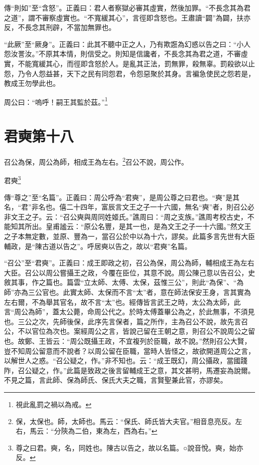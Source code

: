 {\noindent\zhuan{}\fzbyks 傳“則如”至“含怒”。正義曰：君人者察獄必審其虛實，然後加罪。“不長念其為君之道”，謂不審察虛實也。“不寬緩其心”，言徑即含怒也。王肅讀“闢”為闢，扶亦反，不長念其刑辟，不當加無罪也。 \par}

{\noindent\shu{}\fzkt “此厥”至“厥身”。正義曰：此其不聽中正之人，乃有欺誑為幻惑以告之曰：“小人怨汝詈汝。”不原其本情，則信受之。則知是信讒者，不長念其為君之道，不審虛實，不能寬緩其心，而徑即含怒於人。是亂其正法，罰無罪，殺無辜。罰殺欲以止怨，乃令人怨益甚，天下之民有同怨君，令怨惡聚於其身。言褊急使民之怨若是，教成王勿學此也。 \par}

周公曰：“嗚呼！嗣王其監於茲。”\footnote{視此亂罰之禍以為戒。}

\section{君奭第十八}


召公為保，周公為師，相成王為左右。\footnote{保，太保也。師，太師也。馬云：“保氏、師氏皆大夫官。”相音息亮反。左右，馬云：“分陝為二伯，東為左，西為右。”}召公不說，周公作。

君奭\footnote{尊之曰君。奭，名，同姓也。陳古以告之，故以名篇。○說音悅。奭，始亦反。}


{\noindent\zhuan{}\fzbyks 傳“尊之”至“名篇”。正義曰：周公呼為“君奭”，是周公尊之曰君也。“奭”是其名，“君”非名也。僖二十四年，富辰言文王之子一十六國，無名“奭”者，則召公必非文王之子。云：“召公奭與周同姓姬氏。”譙周曰：“周之支族。”譙周考校古史，不能知其所出。皇甫謐云：“原公名豐，是其一也，是為文王之子一十六國。”然文王之子本無定數，並原、豐為一，當召公於中以為十六，謬矣。此篇多言先世有大臣輔政，是“陳古道以告之”。呼居奭以告之，故以“君奭”名篇。 \par}

{\noindent\shu{}\fzkt “召公”至“君奭”。正義曰：成王即政之初，召公為保，周公為師，輔相成王為左右大臣。召公以周公嘗攝王之政，今覆在臣位，其意不說。周公陳己意以告召公，史敘其事，作之篇也。篇雲“立太師、太傅、太保，茲惟三公”，則此“為保”、“為師”亦為三公官也。此實太師、太保而不言“太”者，意在師法保安王身，言其實為左右爾，不為舉其官名，故不言“太”也。經傳皆言武王之時，太公為太師，此言“周公為師”，蓋太公薨，命周公代之。於時太傅蓋畢公為之，於此無事，不須見也。三公之次，先師後保，此序先言保者，篇之所作，主為召公不說，故先言召公，不以官位為次也。案經周公之言，皆說己留在王朝之意，則召公不說周公之留也。故鄭、王皆云：“周公既攝王政，不宜複列於臣職，故不說。”然則召公大賢，豈不知周公留意而不說者？以周公留在臣職，當時人皆怪之，故欲開道周公之言，以解世人之惑。“召公疑之，作。”非不知也。云：“成王既幻，周公攝政，當國踐阼，召公疑之，作。”此篇是致政之後言留輔成王之意，其文甚明，馬遷妄為說爾。不見之篇，言此師、保為師氏、保氏大夫之職，言賢聖兼此官，亦謬矣。 \par}

